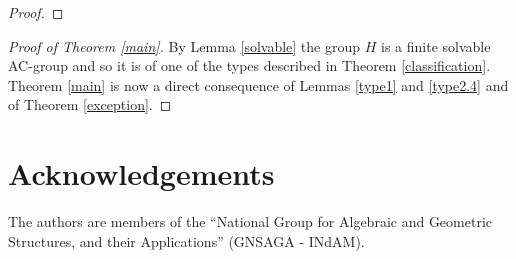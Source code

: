 \documentclass[12pt]{amsart}
\theoremstyle{definition}
\theoremstyle{remark}
\theoremstyle{plain}
\theoremstyle{plain}
\theoremstyle{plain}
\theoremstyle{plain}
\theoremstyle{plain}
\theoremstyle{remark}
\theoremstyle{remark}
\theoremstyle{definition}
\begin{document}
\begin{proof}
\end{proof}

\begin{proof}[Proof of Theorem \ref{main}] 
By Lemma \ref{solvable} the group $H$ is a finite solvable AC-group and so it is of one of the types described in Theorem \ref{classification}.
Theorem \ref{main} is now a direct consequence of Lemmas \ref{type1} and \ref{type2.4} and of Theorem \ref{exception}.
\end{proof}

\section{Acknowledgements}
The authors are members of the ``National Group for Algebraic and Geometric Structures, and their
Applications'' (GNSAGA - INdAM).



\end{document}
